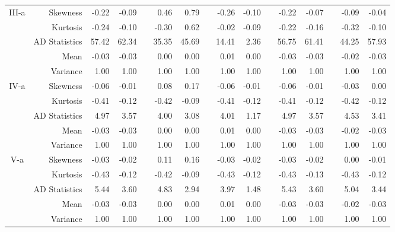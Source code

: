 \documentclass[11pt,authoryear,review,3p,times]{elsarticle}
\begin{document}
\begin{table}[htbp]
{\begin{tabular}{crrrrrrrrrrrrrrr}
					
					III-a   & Skewness & -0.22 & -0.09 &       & 0.46  & 0.79  &       & -0.26 & -0.10 &       & -0.22 & -0.07 &       & -0.09 & -0.04 \\
					& Kurtosis & -0.24 & -0.10 &       & -0.30 & 0.62  &       & -0.02 & -0.09 &       & -0.22 & -0.16 &       & -0.32 & -0.10 \\
					& AD Statistics & 57.42 & 62.34 &       & 35.35 & 45.69 &       & 14.41 & 2.36  &       & 56.75 & 61.41 &       & 44.25 & 57.93 \\
					\hline
					
					& Mean  & -0.03 & -0.03 &       & 0.00  & 0.00  &       & 0.01  & 0.00  &       & -0.03 & -0.03 &       & -0.02 & -0.03 \\
					& Variance    & 1.00  & 1.00  &       & 1.00  & 1.00  &       & 1.00  & 1.00  &       & 1.00  & 1.00  &       & 1.00  & 1.00 \\
					IV-a    & Skewness & -0.06 & -0.01 &       & 0.08  & 0.17  &       & -0.06 & -0.01 &       & -0.06 & -0.01 &       & -0.03 & 0.00 \\
					& Kurtosis & -0.41 & -0.12 &       & -0.42 & -0.09 &       & -0.41 & -0.12 &       & -0.41 & -0.12 &       & -0.42 & -0.12 \\
					& AD Statistics & 4.97  & 3.57  &       & 4.00  & 3.08  &       & 4.01  & 1.17  &       & 4.97  & 3.57  &       & 4.53  & 3.41 \\
					\hline
					& Mean  & -0.03 & -0.03 &       & 0.00  & 0.00  &       & 0.01  & 0.00  &       & -0.03 & -0.03 &       & -0.02 & -0.03 \\
					& Variance    & 1.00  & 1.00  &       & 1.00  & 1.00  &       & 1.00  & 1.00  &       & 1.00  & 1.00  &       & 1.00  & 1.00 \\
					V-a   & Skewness & -0.03 & -0.02 &       & 0.11  & 0.16  &       & -0.03 & -0.02 &       & -0.03 & -0.02 &       & 0.00  & -0.01 \\
					& Kurtosis & -0.43 & -0.12 &       & -0.42 & -0.09 &       & -0.43 & -0.12 &       & -0.43 & -0.13 &       & -0.43 & -0.12 \\
					& AD Statistics & 5.44  & 3.60  &       & 4.83  & 2.94  &       & 3.97  & 1.48  &       & 5.43  & 3.60  &       & 5.04  & 3.44 \\
					\hline
					& Mean  & -0.03 & -0.03 &       & 0.00  & 0.00  &       & 0.01  & 0.00  &       & -0.03 & -0.03 &       & -0.02 & -0.03 \\
					& Variance    & 1.00  & 1.00  &       & 1.00  & 1.00  &       & 1.00  & 1.00  &       & 1.00  & 1.00  &       & 1.00  & 1.00 \\

\end{tabular}}
\end{table}
\end{document}
